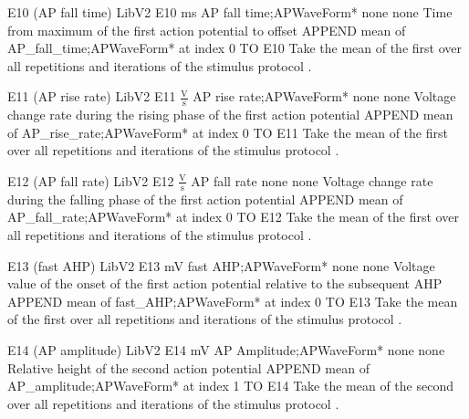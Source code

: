 \begin{efeature}
  {E10 (AP fall time)}
  {LibV2}
  {E10}
  {ms}
  {AP fall time;APWaveForm*}
  {none}
  {none}
  {Time from maximum of the first action potential to offset}
  {
  APPEND mean of AP\_fall\_time;APWaveForm* at index 0 TO E10
  }
  Take the mean of the first  over all repetitions and iterations of the stimulus protocol .
  
\end{efeature}

\begin{efeature}
  {E11 (AP rise rate)}
  {LibV2}
  {E11}
  {$\frac{\mathrm{V}}{\mathrm{s}}$}
  {AP rise rate;APWaveForm*}
  {none}
  {none}
  {Voltage change rate during the rising phase of the first action potential}
  {
  APPEND mean of AP\_rise\_rate;APWaveForm* at index 0 TO E11
  }
  Take the mean of the first  over all repetitions and iterations of the stimulus protocol .
  
\end{efeature}

\begin{efeature}
  {E12 (AP fall rate)}
  {LibV2}
  {E12}
  {$\frac{\mathrm{V}}{\mathrm{s}}$}
  {AP fall rate}
  {none}
  {none}
  {Voltage change rate during the falling phase of the first action potential}
  {
  APPEND mean of AP\_fall\_rate;APWaveForm* at index 0 TO E12
  }
  Take the mean of the first  over all repetitions and iterations of the stimulus protocol .
  
\end{efeature}

\begin{efeature}
  {E13 (fast AHP)}
  {LibV2}
  {E13}
  {mV}
  {fast AHP;APWaveForm*}
  {none}
  {none}
  {Voltage value of the onset of the first action potential relative to the subsequent AHP}
  {
  APPEND mean of fast\_AHP;APWaveForm* at index 0 TO E13
  }
  Take the mean of the first  over all repetitions and iterations of the stimulus protocol .
  
\end{efeature}

\begin{efeature}
  {E14 (AP amplitude)}
  {LibV2}
  {E14}
  {mV}
  {AP Amplitude;APWaveForm*}
  {none}
  {none}
  {Relative height of the second action potential}
  {
  APPEND mean of AP\_amplitude;APWaveForm* at index 1 TO E14
  }
  Take the mean of the second  over all repetitions and iterations of the stimulus protocol .
  
\end{efeature}

